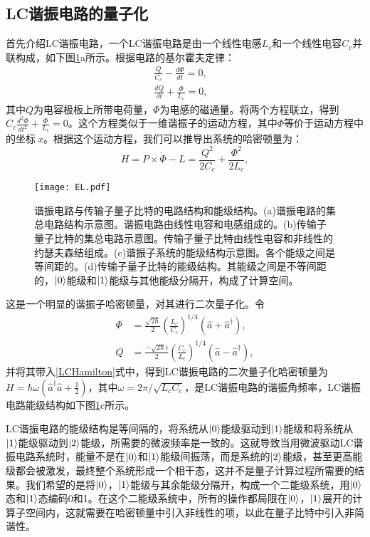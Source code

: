 \subsection{LC谐振电路的量子化}
首先介绍LC谐振电路，一个LC谐振电路是由一个线性电感$ L_{c}$和一个线性电容$ C_{c}$并联构成，如下图\ref{fig:EL}a所示。根据电路的基尔霍夫定律：
\begin{equation}
	\begin{split}
		\frac{Q}{C_{c}}-\frac{{d}\Phi}{{d}t}=0, & \\
		\frac{{d}Q}{{d}t}+\frac{\Phi}{L_{c}}=0, & 
	\end{split}
\end{equation}
其中$ Q$为电容极板上所带电荷量，$ \Phi$为电感的磁通量。将两个方程联立，得到$ C_{c}\frac{{d}^{2} \Phi}{{d}t^{2}}+\frac{\Phi}{L_{c}}=0$。这个方程类似于一维谐振子的运动方程，其中$\Phi$等价于运动方程中的坐标$\ x$。根据这个运动方程，我们可以推导出系统的哈密顿量为：
\begin{equation}\label{LCHamilton}
	H = P\times\dot{\Phi}-L = \dfrac{Q^{2}}{2C_{c}}+\dfrac{\Phi^{2}}{2L_{c}},
\end{equation}
\begin{figure}[h]
	\centering
	\texttt{[image: EL.pdf]}
	\caption{谐振电路与传输子量子比特的电路结构和能级结构。(a)谐振电路的集总电路结构示意图。谐振电路由线性电容和电感组成的。(b)传输子量子比特的集总电路示意图。传输子量子比特由线性电容和非线性的约瑟夫森结组成。(c)谐振子系统的能级结构示意图。各个能级之间是等间距的。(d)传输子量子比特的能级结构。其能级之间是不等间距的，$\left|0\right>$能级和$\left|1\right>$能级与其他能级分隔开，构成了计算空间。}
	\label{fig:EL}
\end{figure}
这是一个明显的谐振子哈密顿量，对其进行二次量子化。令
\begin{equation}
	\begin{split}
		\Phi &= \frac{\sqrt{2\hbar}}{2}(\frac{L_{c}}{C_{c}})^{1/4}\left(\hat{a}+\hat{a}^{\dagger}\right),\\
		Q &= \frac{-\sqrt{2\hbar}{i}}{2}(\frac{C_{c}}{L_{c}})^{1/4}\left(\hat{a}-\hat{a}^{\dagger}\right),
	\end{split}
\end{equation}
并将其带入\ref{LCHamilton}式中，得到LC谐振电路的二次量子化哈密顿量为$ H = {\hbar}\omega\left( \hat{a}^{\dagger}\hat{a}+\frac{1}{2}\right) $，其中$ \omega=2\pi/\sqrt{L_{c}C_{c}}$，是LC谐振电路的谐振角频率，LC谐振电路能级结构如下图\ref{fig:EL}c所示。

LC谐振电路的能级结构是等间隔的，将系统从$\left|0\right>$能级驱动到$\left|1\right>$能级和将系统从$\left|1\right>$能级驱动到$\left|2\right>$能级，所需要的微波频率是一致的。这就导致当用微波驱动LC谐振电路系统时，能量不是在$\left|0\right>$和$\left|1\right>$能级间振荡，而是系统的$\left|2\right>$能级，甚至更高能级都会被激发，最终整个系统形成一个相干态，这并不是量子计算过程所需要的结果。我们希望的是将$\left|0\right>$，$\left|1\right>$能级与其余能级分隔开，构成一个二能级系统，用$\left|0\right>$态和$\left|1\right>$态编码0和1。在这个二能级系统中，所有的操作都局限在$\left|0\right>$，$\left|1\right>$展开的计算子空间内，这就需要在哈密顿量中引入非线性的项，以此在量子比特中引入非简谐性。

